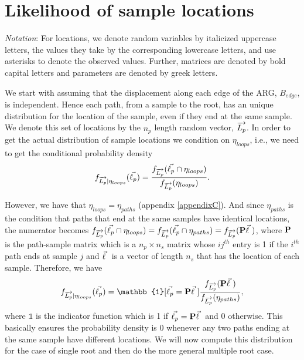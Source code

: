 \appendix
\setcounter{figure}{0}
\renewcommand{\thefigure}{S\arabic{figure}}


\section{Likelihood of sample locations}
\label{appendix:MLE}

\textit{Notation}: For locations, we denote random variables by italicized uppercase letters, the values they take by the corresponding lowercase letters, and use asterisks to denote the observed values. Further, matrices are denoted by bold capital letters and parameters are denoted by greek letters. 

We start with assuming that the displacement along each edge of the ARG, $B_{edge}$, is independent. Hence each path, from a sample to the root, has an unique distribution for the location of the sample, even if they end at the same sample. We denote this set of locations by the $n_p$ length random vector, $\overrightarrow{L_p}$. In order to get the actual distribution of sample locations we condition on $\eta_{loops}$, i.e., we need to get the conditional probability density 
\begin{eqnarray}\label{eq:fLpLoops}
 f_{\overrightarrow{L_p}|\eta_{loops}}(\vec{\ell_p}) = \frac{f_{\overrightarrow{L_p}}(\vec{\ell_p} \cap \eta_{loops})}{f_{\overrightarrow{L_p}}(\eta_{loops})}. 
\end{eqnarray} 

However, we have that $\eta_{loops} = \eta_{paths}$ (appendix \ref{appendixC}). And since $\eta_{paths}$ is the condition that paths that end at the same samples have identical locations, the numerator becomes $f_{\overrightarrow{L_p}}(\vec{\ell_p} \cap \eta_{loops}) = f_{\overrightarrow{L_p}}(\vec{\ell_p} \cap \eta_{paths}) = f_{\overrightarrow{L_p}}(\mathbf{P} \vec{\ell} \ )$, where $\mathbf{P}$ is the path-sample matrix which is a $n_p \times n_s$ matrix whose $ij^{th}$ entry is 1 if the $i^{th}$ path ends at sample $j$ and $\vec{\ell} \ $ is a vector of length $n_s$ that has the location of each sample. 
Therefore, we have 
\begin{eqnarray}
\label{eqn:conditional}
    f_{\Lpvec|\eta_{loops}}(\lpvec) = \mathbb{1}[\lpvec = \Pp \lvec] \frac{f_{\Lpvec}(\Pp \lvec)}{f_{\Lpvec}(\eta_{paths})},
\end{eqnarray}
where $\mathbb{1}$ is the indicator function which is 1 if $\vec{\ell_p} = \mathbf{P} \vec{\ell} \ $ and 0 otherwise. This basically ensures the probability density is 0 whenever any two paths ending at the same sample have different locations. We will now compute this distribution for the case of single root and then do the more general multiple root case. 

